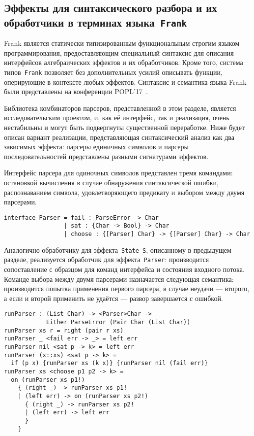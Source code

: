 \documentclass [a4paper] {article}
\begin{document}
\subsection{Эффекты для синтаксического разбора и их обработчики
            в терминах языка~\texttt{Frank}}

Frank является статически типизированным функциональным
строгим языком программирования, предоставляющим специальный синтаксис для
описания интерфейсов алгебраических эффектов и их обработчиков.
Кроме того, система типов~\texttt{Frank} позволяет без дополнительных усилий описывать
функции, оперирующие в контексте любых эффектов. Синтаксис и семантика языка
Frank были представлены на конференции POPL'17~\cite{Frank}.

Библиотека комбинаторов парсеров, представленной в этом разделе, является
исследовательским проектом, и, как её интерфейс, так и реализация, очень
нестабильны и могут быть подвергнуты существенной переработке.
Ниже будет описан вариант реализации, представляющая синтаксический анализ
как два зависимых эффекта: парсеры единичных символов и парсеры
последовательностей представлены разными сигнатурами эффектов.

Интерфейс парсера для одиночных символов представлен тремя командами: остановкой
вычисления в случае обнаружения синтаксической ошибки, распознаванием символа,
удовлетворяющего предикату и выбором между двумя парсерами.

\begin{verbatim}
interface Parser = fail : ParseError -> Char
                 | sat : {Char -> Bool} -> Char
                 | choose : {[Parser] Char} -> {[Parser] Char} -> Char
\end{verbatim}

Аналогично обработчику для эффекта~\texttt{State S}, описанному в предыдущем
разделе, реализуется обработчик для эффекта~\texttt{Parser}: производится
сопоставление с образцом для команд интерфейса и состояния входного потока.
Команде выбора между двумя парсерами назначается следующая семантика:
производится попытка применения первого парсера, в случае неудачи --- второго, а
если и второй применить не удаётся --- развор завершается с ошибкой.

\begin{verbatim}
runParser : (List Char) -> <Parser>Char ->
            Either ParseError (Pair Char (List Char))
runParser xs r = right (pair r xs)
runParser _ <fail err -> _> = left err
runParser nil <sat p -> k> = left err
runParser (x::xs) <sat p -> k> =
  if (p x) {runParser xs (k x)} {runParser nil (fail err)}
runParser xs <choose p1 p2 -> k> =
  on (runParser xs p1!)
    { (right _) -> runParser xs p1!
    | (left err) -> on (runParser xs p2!)
      { (right _) -> runParser xs p2!
      | (left err) -> left err
      }
    }
\end{verbatim}
\end{document}

